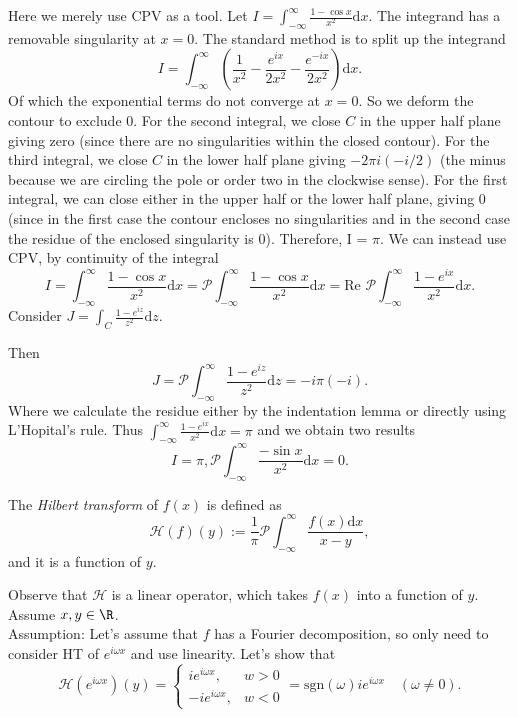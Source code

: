 \documentclass[a4paper]{article}
\begin{document}
\begin{eg}
Here we merely use CPV as a tool. Let $I = \int_{-\infty}^{\infty} \frac{1 - \cos x}{x^2}\text{d}x $. The integrand has a removable singularity at $x = 0$. The standard method is to split up the integrand 
\[
    I = \int_{-\infty}^{\infty} \left( \frac{1}{x^2} - \frac{e^{ i x}}{2x^2} - \frac{e^{ - ix}}{2x^2} \right)  \text{d}x
.\] 
Of which the exponential terms do not converge at $x =0$. So we deform the contour to exclude $0$. For the second integral, we close $C$ in the upper half plane giving zero (since there are no singularities within the closed contour). For the third integral, we close $C$ in the lower half plane giving $- 2 \pi  i ( - i / 2)$ (the minus because we are circling the pole or order two in the clockwise sense). For the first integral, we can close either in the upper half or the lower half plane, giving $0$ (since in the first case the contour encloses no singularities and in the second case the residue of the enclosed singularity is 0). Therefore, I = $\pi$. We can instead use CPV, by continuity of the integral 
\[
I = \int_{-\infty}^{\infty} \frac{1 - \cos x}{ x^2}\text{d}x = \mathcal{P} \int_{-\infty}^{\infty} \frac{1 - \cos x}{ x^2}\text{d}x = \text{Re } \mathcal{P} \int_{-\infty}^{\infty} \frac{1 - e^{ix}}{ x^2}\text{d}x
.\] 
Consider $J = \int_C \frac{1 - e^{ i z}}{z^2} \text{d}z$. 
\begin{center}
\end{center}
Then
\[
    J = \mathcal{P} \int_{-\infty}^{\infty} \frac{ 1 - e^{ i z}}{z^2} \text{d}z = - i \pi ( - i) 
.\] 
Where we calculate the residue either by the indentation lemma or directly using L'Hopital's rule. Thus $\int_{-\infty}^{\infty} \frac{1  - e^{ix}}{x^2}\text{d}x = \pi$ and we obtain two results
\[
I = \pi, \mathcal{P}\int_{-\infty}^{\infty} \frac{- \sin x}{x^2}\text{d}x = 0
.\] 
\end{eg}
\begin{defi}
    The \emph{Hilbert transform} of $f(x)$ is defined as 
    \[
        \mathcal{H}(f)(y):= \frac{1}{\pi} \mathcal{P} \int_{-\infty}^{\infty} \frac{f(x) \text{d}x}{ x - y}
    ,\]
    and it is a function of $y$.
\end{defi}
Observe that $\mathcal{H}$ is a linear operator, which takes $f(x)$ into a function of $y$. Assume $x,y \in  \R$. \\
Assumption: Let's assume that $f$ has a Fourier decomposition, so only need to consider HT of $e^{ i \omega x} $ and use linearity. Let's show that 
\[
    \mathcal{H} (e^{ i \omega x})(y) = \begin{cases}
        i e^{ i \omega x} , & w > 0 \\
        - i e^{ i \omega x}, & w < 0
    \end{cases}
    = \text{sgn}(\omega) i e^{ i \omega x} \quad (\omega \ne 0)
.\]
\end{document}
